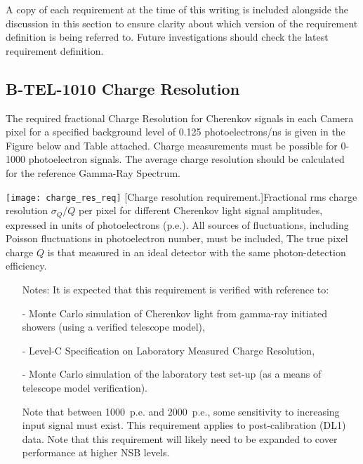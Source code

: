 A copy of each requirement at the time of this writing is included alongside the discussion in this section to ensure clarity about which version of the requirement definition is being referred to. Future investigations should check the latest requirement definition. \vfill

\begin{requirement}{\subsection{B-TEL-1010 Charge Resolution}} \label{section:cr}
	The required fractional Charge Resolution for Cherenkov signals in each Camera pixel for a specified background level of 0.125 photoelectrons/ns is given in the Figure below and Table attached. Charge measurements must be possible for 0-1000 photoelectron signals. The average charge resolution should be calculated for the reference Gamma-Ray Spectrum.
    
	\centering\texttt{[image: charge\_res\_req]}
	[Charge resolution requirement.]{Fractional rms charge resolution $\sigma_Q/Q$ per pixel for different Cherenkov light signal amplitudes, expressed in units of photoelectrons (p.e.). All sources of fluctuations, including Poisson fluctuations in photoelectron number, must be included, The true pixel charge $Q$ is that measured in an ideal detector with the same photon-detection efficiency. }\label{fig:charge_res_req}
    
\begin{itemize}
\item [Notes:] It is expected that this requirement is verified with reference to:

- Monte Carlo simulation of Cherenkov light from gamma-ray initiated showers (using a verified telescope model),

- Level-C Specification on Laboratory Measured Charge Resolution,

- Monte Carlo simulation of the laboratory test set-up (as a means of telescope model verification).

Note that between 1000~p.e. and 2000~p.e., some sensitivity to increasing input signal must exist. \newline
This requirement applies to post-calibration (DL1) data. \newline
Note that this requirement will likely need to be expanded to cover performance at higher NSB levels.
\end{itemize}
\end{requirement}

